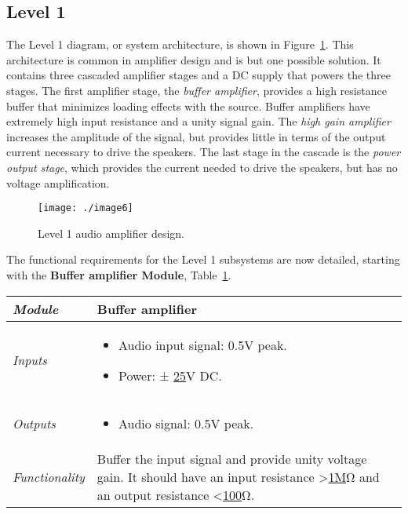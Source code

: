 \subsection*{Level 1}
\label{subsection:level-1}

The Level 1 diagram, or system architecture, is shown in 
Figure~\ref{figure:level1PowerAmp}.
This architecture is common in amplifier design and is but one possible
solution. It contains three cascaded amplifier stages and a DC supply
that powers the three stages. The first amplifier stage, the
\emph{buffer amplifier}, provides a high resistance buffer that
minimizes loading effects with the source. Buffer amplifiers have
extremely high input resistance and a unity signal gain. The \emph{high
gain amplifier} increases the amplitude of the signal, but provides
little in terms of the output current necessary to drive the speakers.
The last stage in the cascade is the \emph{power output stage}, which
provides the current needed to drive the speakers, but has no voltage
amplification.

\begin{figure}[h]
\centering
\texttt{[image: ./image6]}
\caption{Level 1 audio amplifier design.}
\label{figure:level1PowerAmp}
\end{figure}

The functional requirements for the Level 1 subsystems are now detailed,
starting with the \textbf{Buffer amplifier Module},
Table~\ref{table:level1BufferAmplifier}.

\begin{table}[h]
\label{table:level1BufferAmplifier}
\begin{tabular}{|l|m{10cm}|}
\hline
\emph{Module} &
Buffer amplifier \\ \hline
\emph{Inputs} & 
\begin{itemize}
\item
  Audio input signal: 0.5V peak.
\item
  Power: ± \ul{25}V DC.
\end{itemize}\\ \hline

\emph{Outputs} & 
\begin{itemize}
\item
  Audio signal: 0.5V peak.
\end{itemize}   \\ \hline
\emph{Functionality} & Buffer the input signal and provide unity voltage
gain. It should have an input resistance \textgreater{}\ul{1M}Ω and an
output resistance \textless{}\ul{100}Ω. \\ \hline
\end{tabular}
\end{table}

